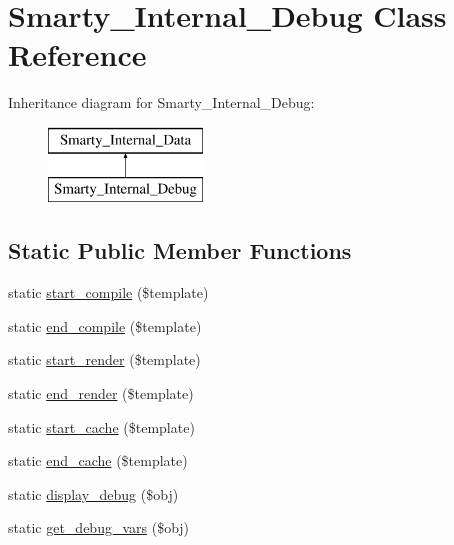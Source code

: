 \hypertarget{class_smarty___internal___debug}{}\section{Smarty\+\_\+\+Internal\+\_\+\+Debug Class Reference}
\label{class_smarty___internal___debug}
Inheritance diagram for Smarty\+\_\+\+Internal\+\_\+\+Debug\+:\begin{figure}[H]
\begin{center}
\leavevmode
\includegraphics[height=2.000000cm]{class_smarty___internal___debug}
\end{center}
\end{figure}
\subsection*{Static Public Member Functions}
\begin{DoxyCompactItemize}
\item 
static \hyperlink{class_smarty___internal___debug_a2375e12791f30f407783b524c22ebd5b}{start\+\_\+compile} (\$template)
\item 
static \hyperlink{class_smarty___internal___debug_a394cd65d31ae3c195de489a25baff5ec}{end\+\_\+compile} (\$template)
\item 
static \hyperlink{class_smarty___internal___debug_ac9647e780daebda96481e04d752e0013}{start\+\_\+render} (\$template)
\item 
static \hyperlink{class_smarty___internal___debug_a425538086a562b7fc7f6f4842e5e15ab}{end\+\_\+render} (\$template)
\item 
static \hyperlink{class_smarty___internal___debug_a7e88b94bd037f31c38f1353be59a3310}{start\+\_\+cache} (\$template)
\item 
static \hyperlink{class_smarty___internal___debug_a4fd075a44aa8c667363333dd68d73fd9}{end\+\_\+cache} (\$template)
\item 
static \hyperlink{class_smarty___internal___debug_a78722573130bf726e0bcbd92fbe67008}{display\+\_\+debug} (\$obj)
\item 
static \hyperlink{class_smarty___internal___debug_a658b5cbbeb42bf16dd5805b6da5c9acc}{get\+\_\+debug\+\_\+vars} (\$obj)
\end{DoxyCompactItemize}

